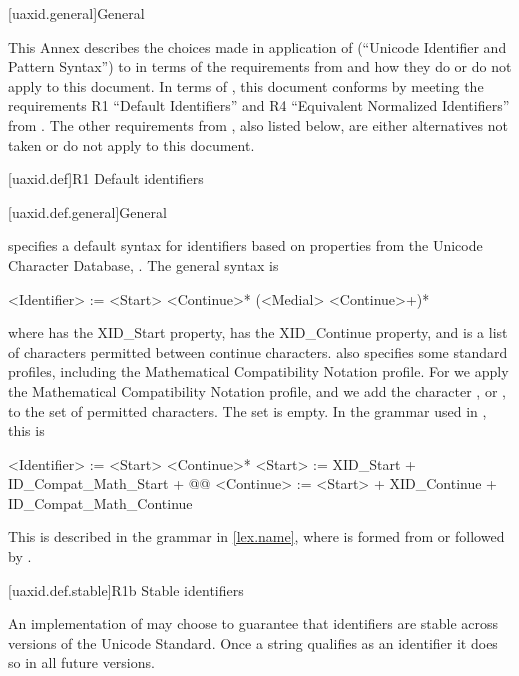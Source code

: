 
[uaxid.general]{General}

\pnum
This Annex describes the choices made in application of
 (``Unicode Identifier and Pattern Syntax'')
to \Cpp{} in terms of the requirements from  and
how they do or do not apply to this document.
In terms of ,
this document conforms by meeting the requirements
R1 ``Default Identifiers'' and
R4 ``Equivalent Normalized Identifiers'' from .
The other requirements from , also listed below,
are either alternatives not taken or do not apply to this document.

[uaxid.def]{R1 Default identifiers}

[uaxid.def.general]{General}
%
%

\pnum
{} specifies a default syntax for identifiers
based on properties from the Unicode Character Database, .
The general syntax is
\begin{outputblock}
<Identifier> := <Start> <Continue>* (<Medial> <Continue>+)*
\end{outputblock}
where  has the XID_Start property,
 has the XID_Continue property, and
 is a list of characters permitted between continue characters.
 also specifies some standard profiles,
including the Mathematical Compatibility Notation profile.
For \Cpp{} we apply the Mathematical Compatibility Notation profile,
and we add the character , or \tcode{_},
to the set of permitted  characters.
The  set is empty.
In the grammar used in , this is
\begin{outputblock}
<Identifier> := <Start> <Continue>*
<Start> := XID_Start + ID_Compat_Math_Start + @\textrm{}@
<Continue> := <Start> + XID_Continue + ID_Compat_Math_Continue
\end{outputblock}

\pnum
This is described in the \Cpp{} grammar in \ref{lex.name},
where  is formed from
 or
 followed by .

[uaxid.def.stable]{R1b Stable identifiers}

\pnum
An implementation of  may choose to guarantee
that identifiers are stable across versions of the Unicode Standard.
Once a string qualifies as an identifier it does so in all future versions.

